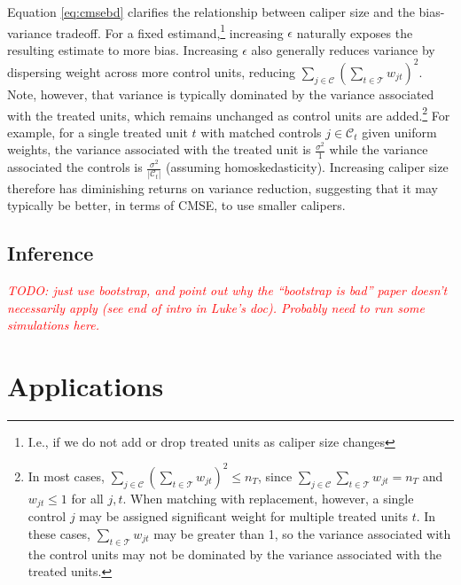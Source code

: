 \documentclass{article}
\newcommand{\Ct}{\mathcal{C}_{t}}
\newcommand{\note}[1]{\textcolor{red}{\textit{#1}}}
\begin{document}
Equation \ref{eq:cmsebd} clarifies the relationship between caliper size and the bias-variance tradeoff.
For a fixed estimand,\footnote{I.e., if we do not add or drop treated units as caliper size changes} increasing $\epsilon$ naturally exposes the resulting estimate to more bias.
Increasing $\epsilon$ also generally reduces variance by dispersing weight across more control units, reducing $\sum_{j \in \mathcal{C}} (\sum_{t \in \mathcal{T}} w_{jt})^2$.
Note, however, that variance is typically dominated by the variance associated with the treated units, which remains unchanged as control units are added.\footnote{In most cases, $\sum_{j \in \mathcal{C}} (\sum_{t \in \mathcal{T}} w_{jt})^2 \leq n_T$, since $\sum_{j \in \mathcal{C}} \sum_{t \in \mathcal{T}} w_{jt} = n_T$ and $w_{jt} \leq 1$ for all $j, t$.
When matching with replacement, however, a single control $j$ may be assigned significant weight for multiple treated units $t$.
In these cases, $\sum_{t \in \mathcal{T}} w_{jt}$ may be greater than 1, so the variance associated with the control units may not be dominated by the variance associated with the treated units.}
For example, for a single treated unit $t$ with matched controls $j \in \Ct$ given uniform weights, the variance associated with the treated unit is
$\frac{\sigma^2}{1}$ while the variance associated the controls is $\frac{\sigma^2}{|\Ct|}$ (assuming homoskedasticity).
Increasing caliper size therefore has diminishing returns on variance reduction, suggesting that it may typically be better, in terms of CMSE, to use smaller calipers.


\subsection{Inference}

\note{TODO: just use bootstrap, and point out why the ``bootstrap is bad'' paper doesn't necessarily apply (see end of intro in Luke's doc).
Probably need to run some simulations here.}


\section{Applications}


\end{document}
